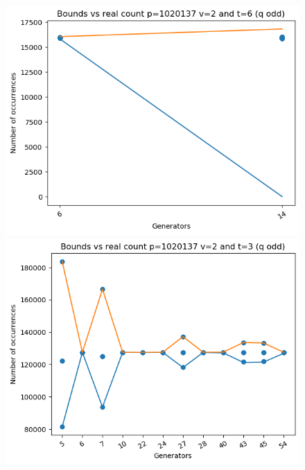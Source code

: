 \documentclass{article}
\begin{document}
\begin{figure}[H]
\begin{minipage}{.49\textwidth}
            \includegraphics[width=\textwidth]{../plots/tuples_figures/1020137v2qodd/test_p1020137_v2_t6_q_odd.png}
    \end{minipage}
    \begin{minipage}{.49\textwidth}
            \centering
            \includegraphics[width=\textwidth]{../plots/tuples_figures/1020137v2qodd/test_p1020137_v2_t3_q_odd.png}

\end{minipage}
\end{figure}
\end{document}
